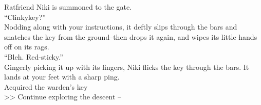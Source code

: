 Ratfriend Niki is summoned to the gate.\\

“Clinkykey?”\\

Nodding along with your instructions, it deftly slips through the bars and snatches the key from the ground--then drops it again, and wipes its little hands off on its rags.\\
“Bleh. Red-sticky.”\\

Gingerly picking it up with its fingers, Niki flicks the key through the bars. It lands at your feet with a sharp ping.\\
 Acquired the warden's key\\

>> Continue exploring the descent -- 
